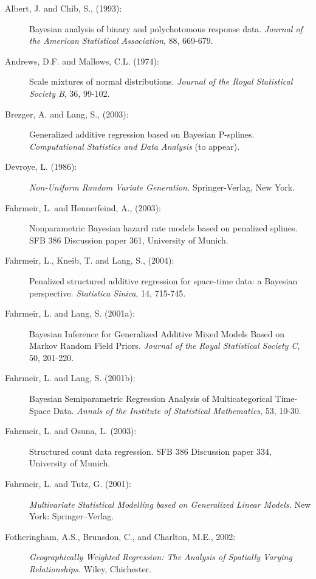 \documentclass[11pt,a4paper,twoside]{bayesxarticle}
\begin{document}
\begin{description}
\item[Albert, J. and Chib, S., (1993):]
Bayesian analysis of binary and polychotomous response data. {\it
Journal of the American Statistical Association},  88, 669-679.


\item[Andrews, D.F. and Mallows, C.L. (1974):]
Scale mixtures of normal distributions. {\it Journal of the Royal
Statistical Society B}, 36, 99-102.


\item[Brezger, A. and Lang, S., (2003):]
Generalized additive regression based on Bayesian P-splines. {\it
Computational Statistics and Data Analysis} (to appear).

\item[Devroye, L. (1986):]
{\it Non-Uniform Random Variate Generation.} Springer-Verlag, New
York.


\item[Fahrmeir, L. and Hennerfeind, A., (2003):]
Nonparametric Bayesian hazard rate models based on penalized
splines. SFB 386 Discussion paper 361, University of Munich.

\item[Fahrmeir, L., Kneib, T. and Lang, S., (2004):] Penalized
structured additive regression for space-time data: a Bayesian
perspective. {\em Statistica Sinica}, 14, 715-745.

\item[Fahrmeir, L. and Lang, S. (2001a):] Bayesian Inference for
Generalized Additive Mixed Models Based on Markov Random Field
Priors. {\em Journal of the Royal Statistical Society C}, 50,
201-220.

\item[Fahrmeir, L. and Lang, S. (2001b):] Bayesian Semiparametric Regression Analysis of Multicategorical
Time-Space Data. {\em Annals of the  Institute of Statistical
Mathematics}, 53, 10-30.

\item[Fahrmeir, L. and Osuna, L. (2003):] Structured count data regression.
SFB 386 Discussion paper 334, University of Munich.

\item[Fahrmeir, L. and Tutz, G. (2001):] {\em Multivariate Statistical
Modelling based on Generalized Linear Models.} New York:
Springer--Verlag.

\item[Fotheringham, A.S., Brunsdon, C., and Charlton, M.E., 2002:]
{\it Geographically Weighted Regression: The Analysis of Spatially
Varying Relationships.} Wiley, Chichester.



\end{description}
\end{document}
